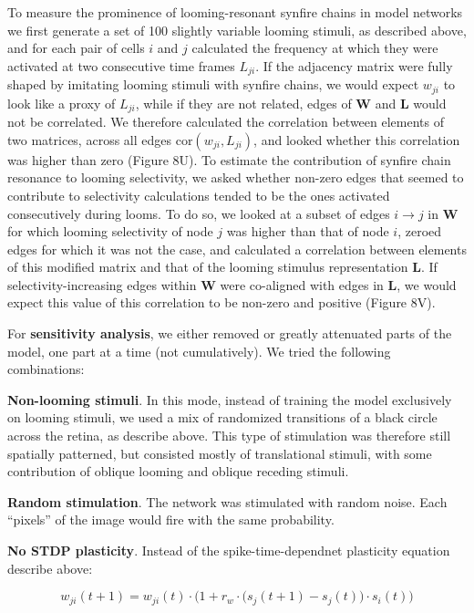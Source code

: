 \documentclass{article}
\begin{document}
To measure the prominence of looming-resonant synfire chains in model networks we first generate a set of 100 slightly variable looming stimuli, as described above, and for each pair of cells $i$ and $j$ calculated the frequency at which they were activated at two consecutive time frames $L_{ji}$. If the adjacency matrix were fully shaped by imitating looming stimuli with synfire chains, we would expect $w_{ji}$ to look like a proxy of $L_{ji}$, while if they are not related, edges of $\mathbf{W}$ and $\mathbf{L}$ would not be correlated. We therefore calculated the correlation between elements of two matrices, across all edges $\text{cor}(w_{ji},L_{ji})$, and looked whether this correlation was higher than zero (Figure 8U). To estimate the contribution of synfire chain resonance to looming selectivity, we asked whether non-zero edges that seemed to contribute to selectivity calculations tended to be the ones activated consecutively during looms. To do so, we looked at a subset of edges $i \rightarrow j$ in $\mathbf{W}$ for which looming selectivity of node $j$ was higher than that of node $i$, zeroed edges for which it was not the case, and calculated a correlation between elements of this modified matrix and that of the looming stimulus representation $\mathbf{L}$. If selectivity-increasing edges within $\mathbf{W}$ were co-aligned with edges in $\mathbf{L}$, we would expect this value of this correlation to be non-zero and positive (Figure 8V).

For \textbf{sensitivity analysis}, we either removed or greatly attenuated parts of the model, one part at a time (not cumulatively). We tried the following combinations:

\textbf{Non-looming stimuli}. In this mode, instead of training the model exclusively on looming stimuli, we used a mix of randomized transitions of a black circle across the retina, as describe above. This type of stimulation was therefore still spatially patterned, but consisted mostly of translational stimuli, with some contribution of oblique looming and oblique receding stimuli.

\textbf{Random stimulation}. The network was stimulated with random noise. Each “pixels” of the image would fire with the same probability.

\textbf{No STDP plasticity}. Instead of the spike-time-dependnet plasticity equation describe above:

\[ w_{ji}(t+1) = w_{ji}(t)\cdot\Big(1+r_w \cdot \big(s_j(t+1)-s_j(t)\big)\cdot s_i(t)\Big) \]
\end{document}

